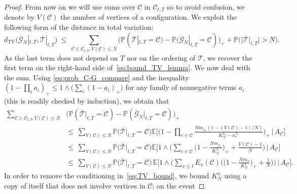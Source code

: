 \begin{refsegment}
\begin{proof}
From now on we will use sums over $\mathcal{C}$ in $\mathscr{C}_{t,T}$
so to avoid confusion, we denote by $V(\mathcal{C})$ the number of
vertices of a configuration. We exploit the following form of the
distance in total variation:
\begin{equation*}
    d_{\mathrm{TV}}\big(\overline{\mathcal{G}}_{N}|_{t,T},\overline{\mathcal{T}}|_{t,T}\big)\
    \leq \ \sum_{\mathcal{C}\in \mathscr{C}_{t,T}, V(\mathcal{C})\leq N}
    \big(\mathbb{P}(\overline{\mathcal{T}}|_{t,T} = \mathcal{C}) -
    \mathbb{P}(\overline{\mathcal{G}}_{N}|_{t,T} = \mathcal{C})\big)_+ 
    + \mathbb{P}\big(\big|\overline{\mathcal{T}}|_{t,T}\big| > N \big).
\end{equation*}
As the last term does not depend on $T$ nor on the ordering of
$\mathcal{T}$, we recover the first term on the right-hand side
of~\eqref{eq:bound_TV_lemma}. We now deal with the sum.
Using \eqref{eq:prob_C-G_compare} and the inequality
$(1-\prod_i a_i)_+ \leq 1\wedge \big(\sum_i(1- a_i)_+)$ for any
family of nonnegative terms $a_i$ (this is readily checked by
induction), we obtain that
\begin{align}\nonumber
  \sum_{\mathcal{C}\in \mathscr{C}_{t,T}, V(\mathcal{C})\leq N}
    &\big(\mathbb{P}(\overline{\mathcal{T}}|_{t,T} = \mathcal{C}) -
    \mathbb{P}(\overline{\mathcal{G}}_{N}|_{t,T} = \mathcal{C})\big)_+ \\ \nonumber
  &\leq\ \sum_{V(\mathcal{C})\leq N}
    \mathbb{P}\big(\overline{\mathcal{T}}|_{t,T} =
    \mathcal{C}\big)\mathbb{E}\Big[\Big(1-\prod_{e \in \mathcal{C}}\frac{N m_{x_e}(1-(V(\mathcal{C})-1)/N)}{K_{N}^{x_e}-\kappa^{x_e}_e}\Big)_+\, \Big\vert\, A_{\mathcal{C}}\Big]
  \\ \nonumber
  & \leq\ \sum_{V(\mathcal{C})\leq N}
    \mathbb{P}\big(\overline{\mathcal{T}}|_{t,T} =
    \mathcal{C}\big)\mathbb{E}\Big[1\wedge \bigg(\sum_{e\in
    \mathcal{C}}\Big(1-\frac{N m_{x_e} }{K_N^{x_e}}\Big)_++
    \frac{V(\mathcal{C}) - 1}{N} \bigg) \, \Big\vert\, A_{\mathcal{C}}\Big]
  \\ \label{eq:TV_bound}
  & \leq\ \sum_{V(\mathcal{C})\leq N}
    \mathbb{P}\big(\overline{\mathcal{T}}|_{t,T} = \mathcal{C}\big)\,
    \mathbb{E}\Big[1\wedge \bigg(\sum_{x\leq t}E_x(\mathcal{C}) \Big(\Big(1-\frac{N m_{x}
    }{K_N^{x}}\Big)_+ + \frac{1}{N}\Big) \bigg) \, \Big\vert\, A_{\mathcal{C}}\Big].
\end{align}
 In order to remove the conditioning
in~\eqref{eq:TV_bound}, we bound $K_N^x$ using a copy of itself that
does not involve vertices in $\mathcal{C}$: on the event

\end{proof}
\end{refsegment}

